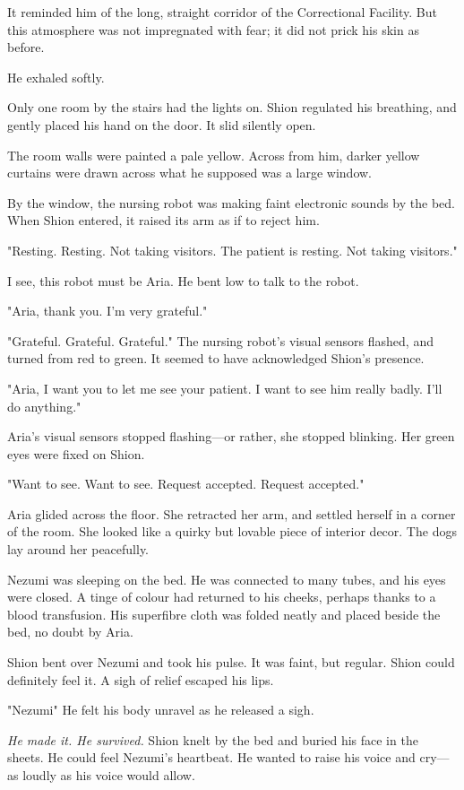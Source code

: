 It reminded him of the long, straight corridor of the Correctional
Facility. But this atmosphere was not impregnated with fear; it did not
prick his skin as before.

He exhaled softly.

Only one room by the stairs had the lights on. Shion regulated his
breathing, and gently placed his hand on the door. It slid silently
open.

The room walls were painted a pale yellow. Across from him, darker
yellow curtains were drawn across what he supposed was a large window.

By the window, the nursing robot was making faint electronic sounds by
the bed. When Shion entered, it raised its arm as if to reject him.

{\sffamily "Resting. Resting. Not taking visitors. The patient is resting. Not
	taking visitors."}

I see, this robot must be Aria. He bent low to talk to the robot.

"Aria, thank you. I'm very grateful."

{\sffamily "Grateful. Grateful. Grateful."} The nursing robot's visual sensors
flashed, and turned from red to green. It seemed to have acknowledged
Shion's presence.

{\sffamily "Aria, I want you to let me see your patient. I want to see him really
	badly. I'll do anything."}

Aria's visual sensors stopped flashing---or rather, she stopped blinking.
Her green eyes were fixed on Shion.

"Want to see. Want to see. Request accepted. Request accepted."

Aria glided across the floor. She retracted her arm, and settled herself
in a corner of the room. She looked like a quirky but lovable piece of
interior decor. The dogs lay around her peacefully.

Nezumi was sleeping on the bed. He was connected to many tubes, and his
eyes were closed. A tinge of colour had returned to his cheeks, perhaps
thanks to a blood transfusion. His superfibre cloth was folded neatly
and placed beside the bed, no doubt by Aria.

Shion bent over Nezumi and took his pulse. It was faint, but regular.
Shion could definitely feel it. A sigh of relief escaped his lips.

"Nezumi\el " He felt his body unravel as he released a sigh.

\emph{He made it. He survived.} Shion knelt by the bed and buried his face in
the sheets. He could feel Nezumi's heartbeat. He wanted to raise his
voice and cry---as loudly as his voice would allow.

